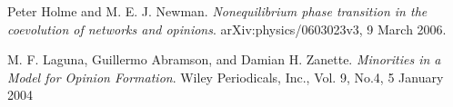\documentclass[11pt]{article}
\begin{document}
\begin{thebibliography}{99}
 Peter Holme and M. E. J. Newman. \textit{Nonequilibrium phase transition in the coevolution of networks and opinions}. arXiv:physics/0603023v3, 9 March 2006.

 M. F. Laguna, Guillermo Abramson, and Damian H. Zanette. \textit{Minorities in a Model for Opinion Formation}. Wiley Periodicals, Inc., Vol. 9, No.4, 5 January 2004

\end{thebibliography} 
\end{document}
